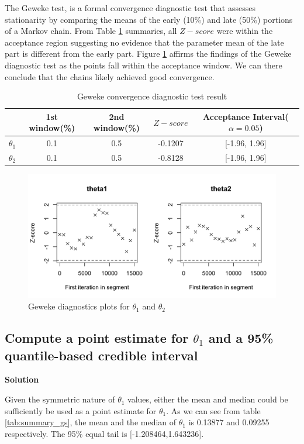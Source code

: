\documentclass[12pt]{article}
\begin{document}
The Geweke test, is a formal convergence diagnostic test that assesses stationarity by comparing the means of the early (10\%) and late (50\%) portions of a Markov chain. From Table \ref{tab:geweke_gs} summaries, all $Z-score$ were within the acceptance region suggesting no evidence that the parameter mean of the late part is different from the early part. Figure \ref{fig:gs-geweke}   affirms the findings of the Geweke diagnostic test as the points fall within the acceptance window. We can there conclude that the chains likely achieved good convergence.
\begin{table}[h!]
\centering
\caption{Geweke convergence diagnostic test result}
\begin{tabular}{lcccc}
\toprule
\textbf{} & \textbf{1st window(\%)} & \textbf{2nd window(\%)} & \textbf{$Z-score$} & \textbf{Acceptance Interval($\alpha = 0.05$)}  \\
\midrule
$\theta_1$ & 0.1& 0.5 & -0.1207  & [-1.96, 1.96] \\
$\theta_2$ & 0.1& 0.5 & -0.8128 & [-1.96, 1.96] \\
\bottomrule
\end{tabular}
\label{tab:geweke_gs}
\end{table}

\begin{figure}[h!]
    \centering
    \includegraphics[width=0.8\linewidth]{pictures/fig05-gs-geweke.png}
    \caption{Geweke diagnostics plots for  $\theta_1$ and $\theta_2$ }
    \label{fig:gs-geweke}
\end{figure}


\subsection{Compute a point estimate for $\theta_1$ and a 95\% quantile-based credible interval}
\textbf{Solution}

Given the symmetric nature of $\theta_1$ values, either the mean and median could be sufficiently be used as a point estimate for $\theta_1$. As we can see from table \ref{tab:summary_gs}, the mean and the median of $\theta_1$ is 0.13877 and 0.09255 respectively. The 95\% equal tail is [-1.208464,1.643236].
\end{document}
